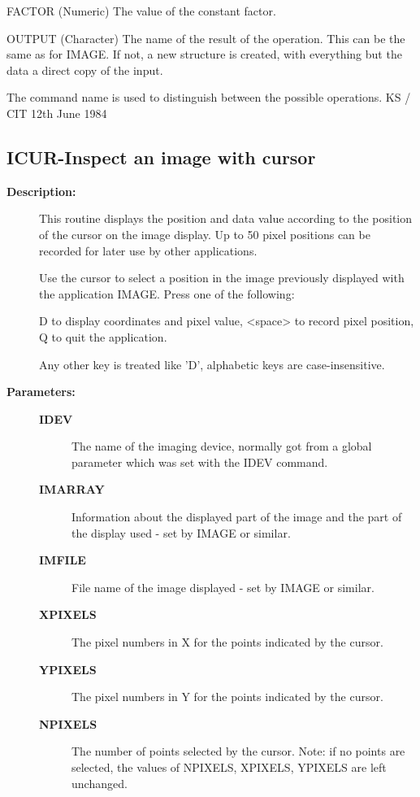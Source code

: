 \begin{description}
\begin{description}
\begin{terminalv}
 FACTOR (Numeric) The value of the constant factor.

 OUTPUT (Character) The name of the result of the operation.  This
        can be the same as for IMAGE.  If not, a new structure
        is created, with everything but the data a direct
        copy of the input.

 The command name is used to distinguish between the
 possible operations.
                                  KS / CIT 12th June 1984
\end{terminalv}
\end{description}
\subsection{ICUR-\label{ICUR}Inspect an image with cursor}
\begin{description}

\item [\textbf{Description:}]
 This routine displays the position and data value according to the
 position of the cursor on the image display. Up to 50 pixel
 positions can be recorded for later use by other applications.

 Use the cursor to select a position in the image previously
 displayed with the application IMAGE. Press one of the following:

      D     to display coordinates and pixel value,
   <space>  to record pixel position,
      Q     to quit the application.

 Any other key is treated like 'D', alphabetic keys are
 case-insensitive.

\item [\textbf{Parameters:}]
\begin{description}
\item [\textbf{IDEV}]
 The name of the imaging device, normally got from a global
 parameter which was set with the IDEV command.
\item [\textbf{IMARRAY}]
 Information about the displayed part of the image and the part
 of the display used - set by IMAGE or similar.
\item [\textbf{IMFILE}]
 File name of the image displayed - set by IMAGE or similar.
\item [\textbf{XPIXELS}]
 The pixel numbers in X for the points indicated by the cursor.
\item [\textbf{YPIXELS}]
 The pixel numbers in Y for the points indicated by the cursor.
\item [\textbf{NPIXELS}]
 The number of points selected by the cursor. Note: if no points
 are selected, the values of NPIXELS, XPIXELS, YPIXELS are left
 unchanged.
\end{description}


\end{description}
\end{description}

